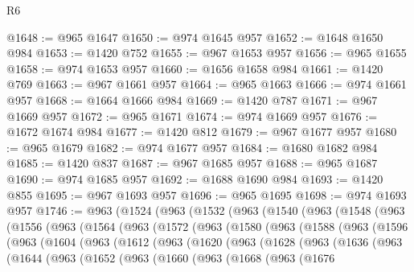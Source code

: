 \begin{lexlean}{R6}
\begin{coremodule}
@1648 := @965 @1647
@1650 := @974 @1645 @957
@1652 := @1648 @1650 @984
@1653 := @1420 @752
@1655 := @967 @1653 @957
@1656 := @965 @1655
@1658 := @974 @1653 @957
@1660 := @1656 @1658 @984
@1661 := @1420 @769
@1663 := @967 @1661 @957
@1664 := @965 @1663
@1666 := @974 @1661 @957
@1668 := @1664 @1666 @984
@1669 := @1420 @787
@1671 := @967 @1669 @957
@1672 := @965 @1671
@1674 := @974 @1669 @957
@1676 := @1672 @1674 @984
@1677 := @1420 @812
@1679 := @967 @1677 @957
@1680 := @965 @1679
@1682 := @974 @1677 @957
@1684 := @1680 @1682 @984
@1685 := @1420 @837
@1687 := @967 @1685 @957
@1688 := @965 @1687
@1690 := @974 @1685 @957
@1692 := @1688 @1690 @984
@1693 := @1420 @855
@1695 := @967 @1693 @957
@1696 := @965 @1695
@1698 := @974 @1693 @957
@1746 := @963
    (@1524
      (@963
        (@1532
          (@963
            (@1540
              (@963
                (@1548
                  (@963
                    (@1556
                      (@963
                        (@1564
                          (@963
                            (@1572
                              (@963
                                (@1580
                                  (@963
                                    (@1588
                                      (@963
                                        (@1596
                                          (@963
                                            (@1604
                                              (@963
                                                (@1612
                                                  (@963
                                                    (@1620
                                                      (@963
                                                        (@1628
                                                          (@963
                                                            (@1636
                                                              (@963
                                                                (@1644
                                                                  (@963
                                                                    (@1652
                                                                      (@963
                                                                        (@1660
                                                                          (@963
                                                                            (@1668
                                                                              (@963
                                                                                (@1676

\end{coremodule}
\end{lexlean}
